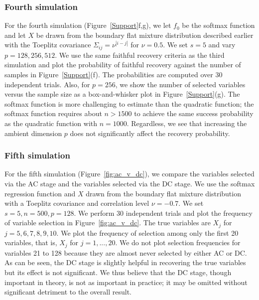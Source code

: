\subsubsection{Fourth simulation}
For the \textrm{fourth simulation} (Figure~\ref{Support}f,g), we let $f_0$ be the softmax function and let $X$ be drawn from the boundary flat mixture distribution described earlier with the Toeplitz covariance $\Sigma_{ij}=\nu^{|i-j|}$ for $\nu = 0.5$. We set $s=5$ and vary $p=128,256,512$. We use the same faithful recovery criteria as the third simulation and plot the probability of faithful recovery against the number of samples in Figure~\ref{Support}(f). The probabilities are computed over 30 independent trials. Also, for $p=256$, we show the number of selected variables versus the sample size as a box-and-whisker plot in Figure~\ref{Support}(g). The softmax function is more challenging to estimate than the quadratic function; the softmax function requires about $n > 1500$ to achieve the same success probability as the quadratic function with $n=1000$. Regardless, we see that increasing the ambient dimension $p$ does not significantly affect the recovery probability.


\subsubsection{Fifth simulation}
For the \textrm{fifth simulation} (Figure~\ref{fig:ac_v_dc}), we compare the variables selected via the AC stage and the variables selected via the DC stage. We use the softmax regression function and $X$ drawn from the boundary flat mixture distribution with a Toeplitz covariance and correlation level $\nu = -0.7$. We set $s=5, n=500, p=128$. We perform 30 independent trials and plot the frequency of variable selection in Figure~\ref{fig:ac_v_dc}. The true variables are $X_j$ for $j=5,6,7,8,9,10$. We plot the frequency of selection among only the first 20 variables, that is, $X_j$ for $j=1,...,20$. We do not plot selection frequencies for variables 21 to 128 because they are almost never selected by either AC or DC. As can be seen, the DC stage is slightly helpful in recovering the true variables but its effect is not significant. We thus believe that the DC stage, though important in theory, is not as important in practice; it may be omitted without significant detriment to the overall result. 

